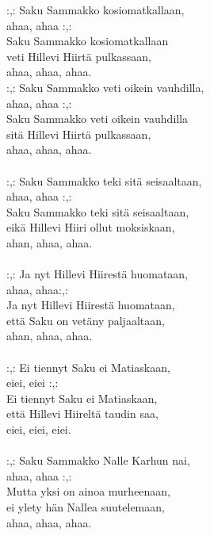 
:,: Saku Sammakko kosiomatkallaan,\\
ahaa, ahaa :,:\\
Saku Sammakko kosiomatkallaan\\
veti Hillevi Hiirtä pulkassaan,\\
ahaa, ahaa, ahaa.
\hspace{10mm} \\
:,: Saku Sammakko veti oikein vauhdilla,\\
ahaa, ahaa :,:\\
Saku Sammakko veti oikein vauhdilla\\
sitä Hillevi Hiirtä pulkassaan,\\
ahaa, ahaa, ahaa.\\
\hspace{10mm} \\
:,: Saku Sammakko teki sitä seisaaltaan,\\
ahaa, ahaa :,:\\
Saku Sammakko teki sitä seisaaltaan,\\
eikä Hillevi Hiiri ollut moksiskaan,\\
ahan, ahaa, ahaa.\\
\hspace{10mm} \\
:,: Ja nyt Hillevi Hiirestä huomataan,\\
ahaa, ahaa:,:\\
Ja nyt Hillevi Hiirestä huomataan,\\
että Saku on vetäny paljaaltaan,\\
ahan, ahaa, ahaa.\\
\hspace{10mm} \\
:,: Ei tiennyt Saku ei Matiaskaan,\\
eiei, eiei :,:\\
Ei tiennyt Saku ei Matiaskaan,\\
että Hillevi Hiireltä taudin saa,\\
eiei, eiei, eiei.\\
\hspace{10mm} \\
:,: Saku Sammakko Nalle Karhun nai,\\
ahaa, ahaa :,:\\
Mutta yksi on ainoa murheenaan,\\
ei ylety hän Nallea suutelemaan,\\
ahaa, ahaa, ahaa.\\